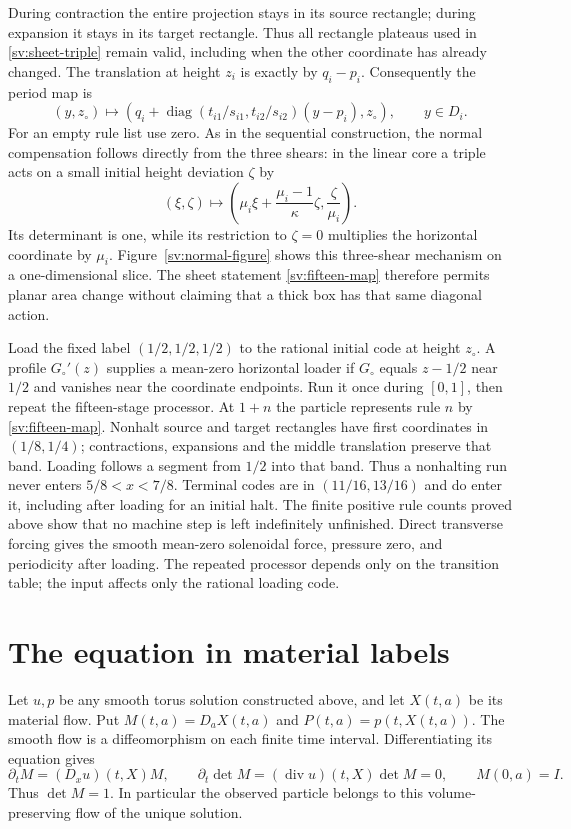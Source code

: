 During contraction the entire projection stays in its source rectangle;
during expansion it stays in its target rectangle.  Thus all rectangle
plateaus used in \eqref{sv:sheet-triple} remain valid, including when
the other coordinate has already changed.  The translation at height
$z_i$ is exactly by $q_i-p_i$.  Consequently the period map is
\begin{equation}\label{sv:fifteen-map}
 (y,z_\circ)\longmapsto
 \left(q_i+\operatorname{diag}(t_{i1}/s_{i1},t_{i2}/s_{i2})
                 (y-p_i),z_\circ\right),\qquad y\in D_i.
\end{equation}
For an empty rule list use zero.  As in the sequential construction,
the normal compensation follows directly from the three shears: in
the linear core a triple
acts on a small initial height deviation $\zeta$ by
\[
 (\xi,\zeta)\longmapsto
 \left(\mu_i\xi+\frac{\mu_i-1}{\kappa}\zeta,
                      \frac{\zeta}{\mu_i}\right).
\]
Its determinant is one, while its restriction to $\zeta=0$ multiplies
the horizontal coordinate by $\mu_i$.  Figure~\ref{sv:normal-figure}
shows this three-shear mechanism on a one-dimensional slice.
The sheet statement
\eqref{sv:fifteen-map} therefore permits planar area change without
claiming that a thick box has that same diagonal action.

Load the fixed label $(1/2,1/2,1/2)$ to the rational initial code
at height $z_\circ$.  A profile $G_\circ'(z)$ supplies a
mean-zero horizontal loader if $G_\circ$ equals $z-1/2$ near
$1/2$ and vanishes near the coordinate endpoints.  Run it once during
$[0,1]$, then repeat the fifteen-stage processor.  At $1+n$ the
particle represents rule $n$ by \eqref{sv:fifteen-map}.  Nonhalt
source and target rectangles have first coordinates in $(1/8,1/4)$;
contractions, expansions and the middle translation preserve that band.
Loading follows a segment from $1/2$ into that band.  Thus a
nonhalting run never enters $5/8<x<7/8$.  Terminal codes are in
$(11/16,13/16)$ and do enter it, including after loading for an
initial halt.  The finite positive rule counts proved above show that
no machine step is left indefinitely unfinished.  Direct transverse
forcing gives the smooth mean-zero solenoidal force, pressure zero,
and periodicity after loading.  The repeated processor depends only on
the transition table; the input affects only the rational loading code.

\section{The equation in material labels}
\label{sv:material}
Let $u,p$ be any smooth torus solution constructed above, and let
$X(t,a)$ be its material flow.  Put
$M(t,a)=D_aX(t,a)$ and $P(t,a)=p(t,X(t,a))$.
The smooth flow is a diffeomorphism on each finite time interval.
Differentiating its equation gives
\[
 \partial_tM=(D_xu)(t,X)M,\qquad
 \partial_t\det M=(\operatorname{div}u)(t,X)\det M=0,
 \qquad M(0,a)=I.
\]
Thus $\det M=1$.  In particular the observed particle belongs to
this volume-preserving flow of the unique solution.

